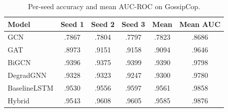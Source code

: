 \documentclass[10pt,twocolumn]{article}
\begin{document}
\begin{table}[h]
  \centering
  \caption{Per-seed accuracy and mean AUC-ROC on GossipCop.}
  \label{tab:appendix}
  \small
  \begin{tabular}{lccccc}
    \toprule
    Model & Seed 1 & Seed 2 & Seed 3 & Mean & Mean AUC \\
    \midrule
    GCN       & .7867 & .7804 & .7797 & .7823 & .8686 \\
    GAT       & .8973 & .9151 & .9158 & .9094 & .9646 \\
    BiGCN     & .9396 & .9375 & .9399 & .9390 & .9798 \\
    DegradGNN & .9328 & .9323 & .9247 & .9300 & .9780 \\
    BaselineLSTM & .9530 & .9556 & .9597 & .9561 & .9858 \\
    Hybrid    & .9543 & .9608 & .9605 & .9585 & .9876 \\
    \bottomrule
  \end{tabular}
\end{table}
\end{document}

